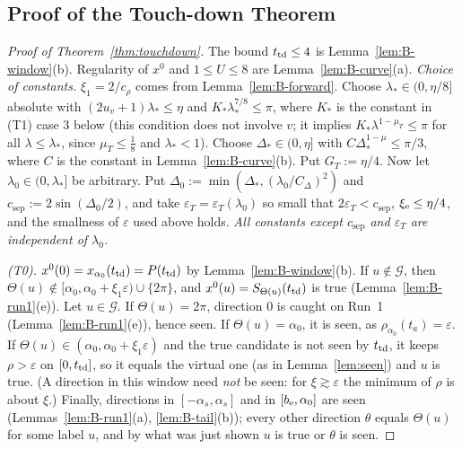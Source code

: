 \subsection{Proof of the Touch-down Theorem}\label{app:B-proof}

\begin{proof}[Proof of Theorem~\ref{thm:touchdown}]
The bound $t_{\mathrm{td}}\le4$ is Lemma~\ref{lem:B-window}(b). Regularity of $x^0$ and $1\le U\le8$ are Lemma~\ref{lem:B-curve}(a).
\emph{Choice of constants.} $\xi_1=2/c_\rho$ comes from Lemma~\ref{lem:B-forward}. Choose $\lambda_*\in(0,\eta/8]$ absolute with
$(2u_v+1)\lambda_*\le\eta$ and $K_*\lambda_*^{7/8}\le\pi$, where $K_*$ is the constant in (T1) case 3 below (this condition
does not involve $v$; it implies $K_*\lambda^{1-\mu_T}\le\pi$ for all $\lambda\le\lambda_*$, since $\mu_T\le\frac18$ and
$\lambda_*<1$). Choose
$\Delta_*\in(0,\eta]$ with $C\Delta_*^{1-\mu}\le\pi/3$, where $C$ is the constant in Lemma~\ref{lem:B-curve}(b). Put
$G_T:=\eta/4$. Now let $\lambda_0\in(0,\lambda_*]$ be arbitrary. Put $\Delta_0:=\min(\Delta_*,(\lambda_0/C_\Delta)^2)$ and
$c_{\mathrm{sep}}:=2\sin(\Delta_0/2)$, and take $\varepsilon_T=\varepsilon_T(\lambda_0)$ so small that $2\varepsilon_T<c_{\mathrm{sep}}$,
$\xi_{\mathrm{e}}\le\eta/4$, and the smallness of $\varepsilon$ used above holds. \emph{All constants except $c_{\mathrm{sep}}$ and $\varepsilon_T$
are independent of $\lambda_0$.}

\emph{(T0).} $x^0(0)=x_{\alpha_0}(t_{\mathrm{td}})=P(t_{\mathrm{td}})$ by Lemma~\ref{lem:B-window}(b). If $u\notin\mathcal G$, then
$\Theta(u)\notin[\alpha_0,\alpha_0+\xi_1\varepsilon)\cup\{2\pi\}$, and $x^0(u)=S_{\Theta(u)}(t_{\mathrm{td}})$ is true
(Lemma~\ref{lem:B-run1}(e)). Let $u\in\mathcal G$. If $\Theta(u)=2\pi$, direction $0$ is caught on Run~1
(Lemma~\ref{lem:B-run1}(e)), hence seen. If $\Theta(u)=\alpha_0$, it is seen, as $\rho_{\alpha_0}(t_a)=\varepsilon$. If
$\Theta(u)\in(\alpha_0,\alpha_0+\xi_1\varepsilon)$ and the true candidate is not seen by $t_{\mathrm{td}}$, it keeps $\rho>\varepsilon$ on
$[0,t_{\mathrm{td}}]$, so it equals the virtual one (as in Lemma~\ref{lem:seen}) and $u$ is true. (A direction in this window need
\emph{not} be seen: for $\xi\gtrsim\varepsilon$ the minimum of $\rho$ is about $\xi$.) Finally, directions in
$[-\alpha_s,\alpha_s]$ and in $[b_{\mathrm{e}},\alpha_0]$ are seen (Lemmas~\ref{lem:B-run1}(a), \ref{lem:B-tail}(b)); every other
direction $\theta$ equals $\Theta(u)$ for some label $u$, and by what was just shown $u$ is true or $\theta$ is seen.


\end{proof}

